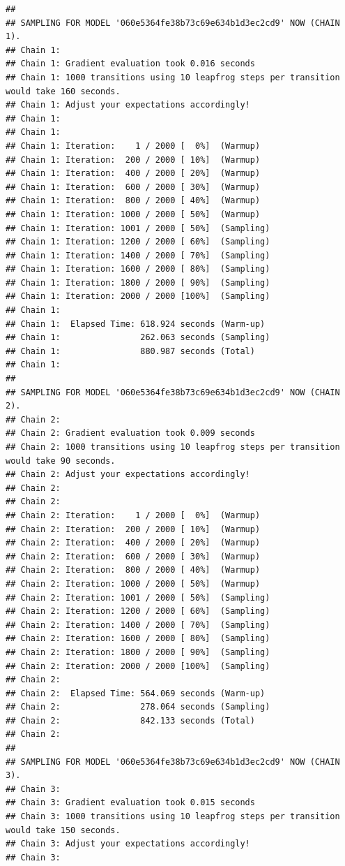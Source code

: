 \documentclass[]{article}
\begin{document}
\begin{verbatim}
## 
## SAMPLING FOR MODEL '060e5364fe38b73c69e634b1d3ec2cd9' NOW (CHAIN 1).
## Chain 1: 
## Chain 1: Gradient evaluation took 0.016 seconds
## Chain 1: 1000 transitions using 10 leapfrog steps per transition would take 160 seconds.
## Chain 1: Adjust your expectations accordingly!
## Chain 1: 
## Chain 1: 
## Chain 1: Iteration:    1 / 2000 [  0%]  (Warmup)
## Chain 1: Iteration:  200 / 2000 [ 10%]  (Warmup)
## Chain 1: Iteration:  400 / 2000 [ 20%]  (Warmup)
## Chain 1: Iteration:  600 / 2000 [ 30%]  (Warmup)
## Chain 1: Iteration:  800 / 2000 [ 40%]  (Warmup)
## Chain 1: Iteration: 1000 / 2000 [ 50%]  (Warmup)
## Chain 1: Iteration: 1001 / 2000 [ 50%]  (Sampling)
## Chain 1: Iteration: 1200 / 2000 [ 60%]  (Sampling)
## Chain 1: Iteration: 1400 / 2000 [ 70%]  (Sampling)
## Chain 1: Iteration: 1600 / 2000 [ 80%]  (Sampling)
## Chain 1: Iteration: 1800 / 2000 [ 90%]  (Sampling)
## Chain 1: Iteration: 2000 / 2000 [100%]  (Sampling)
## Chain 1: 
## Chain 1:  Elapsed Time: 618.924 seconds (Warm-up)
## Chain 1:                262.063 seconds (Sampling)
## Chain 1:                880.987 seconds (Total)
## Chain 1: 
## 
## SAMPLING FOR MODEL '060e5364fe38b73c69e634b1d3ec2cd9' NOW (CHAIN 2).
## Chain 2: 
## Chain 2: Gradient evaluation took 0.009 seconds
## Chain 2: 1000 transitions using 10 leapfrog steps per transition would take 90 seconds.
## Chain 2: Adjust your expectations accordingly!
## Chain 2: 
## Chain 2: 
## Chain 2: Iteration:    1 / 2000 [  0%]  (Warmup)
## Chain 2: Iteration:  200 / 2000 [ 10%]  (Warmup)
## Chain 2: Iteration:  400 / 2000 [ 20%]  (Warmup)
## Chain 2: Iteration:  600 / 2000 [ 30%]  (Warmup)
## Chain 2: Iteration:  800 / 2000 [ 40%]  (Warmup)
## Chain 2: Iteration: 1000 / 2000 [ 50%]  (Warmup)
## Chain 2: Iteration: 1001 / 2000 [ 50%]  (Sampling)
## Chain 2: Iteration: 1200 / 2000 [ 60%]  (Sampling)
## Chain 2: Iteration: 1400 / 2000 [ 70%]  (Sampling)
## Chain 2: Iteration: 1600 / 2000 [ 80%]  (Sampling)
## Chain 2: Iteration: 1800 / 2000 [ 90%]  (Sampling)
## Chain 2: Iteration: 2000 / 2000 [100%]  (Sampling)
## Chain 2: 
## Chain 2:  Elapsed Time: 564.069 seconds (Warm-up)
## Chain 2:                278.064 seconds (Sampling)
## Chain 2:                842.133 seconds (Total)
## Chain 2: 
## 
## SAMPLING FOR MODEL '060e5364fe38b73c69e634b1d3ec2cd9' NOW (CHAIN 3).
## Chain 3: 
## Chain 3: Gradient evaluation took 0.015 seconds
## Chain 3: 1000 transitions using 10 leapfrog steps per transition would take 150 seconds.
## Chain 3: Adjust your expectations accordingly!
## Chain 3: 

\end{verbatim}
\end{document}
